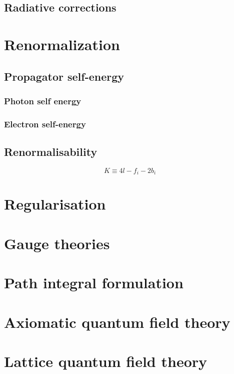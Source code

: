 \section{Radiative corrections}

\chapter{Renormalization}
\section{Propagator self-energy}
\subsection{Photon self energy}
\subsection{Electron self-energy}

\section{Renormalisability}
\[ K \equiv 4l - f_i - 2b_i \]

\chapter{Regularisation}


\chapter{Gauge theories}

\chapter{Path integral formulation}

\chapter{Axiomatic quantum field theory}

\chapter{Lattice quantum field theory}


